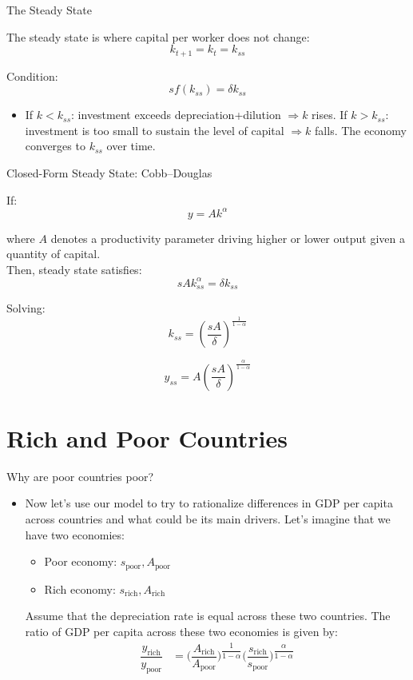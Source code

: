 \documentclass[10pt,aspectratio=169]{beamer}
\begin{document}
\begin{frame}{The Steady State}

The steady state is where capital per worker does not change:
\[
k_{t+1} = k_t = k_{ss}
\]

Condition:
\[
s f(k_{ss}) = \delta k_{ss}
\]

\bigskip

\begin{itemize}
    \item If $k < k_{ss}$: investment exceeds depreciation+dilution $\Rightarrow k$ rises.
    \itemvso If $k > k_{ss}$: investment is too small to sustain the level of capital $\Rightarrow k$ falls.
    \itemvso The economy converges to $k_{ss}$ over time.
\end{itemize}

\end{frame}


\begin{frame}{Closed-Form Steady State: Cobb--Douglas}

If:
\[
y = A k^\alpha
\]

where $A$ denotes a productivity parameter driving higher or lower output given a quantity of capital.\\
\vspace{0.3cm}
Then, steady state satisfies:
\[
s A k_{ss}^\alpha = \delta k_{ss}
\]

Solving:
\[
k_{ss} = 
\left(
\frac{s A}{\delta}
\right)^{\frac{1}{1-\alpha}}
\]

\[
y_{ss} = A
\left(
\frac{s A}{\delta}
\right)^{\frac{\alpha}{1-\alpha}}
\]

\end{frame}

\section{Rich and Poor Countries}
\begin{frame}{Why are poor countries poor?}
\begin{itemize}
\item Now let's use our model to try to rationalize differences in GDP per capita across countries and what could be its main drivers.
\itemvso Let's imagine that we have two economies:
\begin{itemize}
\item Poor economy:  $s_{\text{poor}}, A_{\text{poor}}$
\item Rich economy:  $s_{\text{rich}}, A_{\text{rich}}$
\end{itemize}
\itemvso Assume that the depreciation rate is equal across these two countries.
\itemvso The ratio of GDP per capita across these two economies is given by:
\begin{align*}
\dfrac{y_{\text{rich}}}{y_{\text{poor}}}&=\Bigg(\dfrac{A_{\text{rich}}}{A_{\text{poor}}}\Bigg)^{\dfrac{1}{1-\alpha}} \Bigg(\dfrac{s_{\text{rich}}}{s_{\text{poor}}}\Bigg)^{\dfrac{\alpha}{1-\alpha}}
\end{align*}
\end{itemize}
\end{frame}
\end{document}
